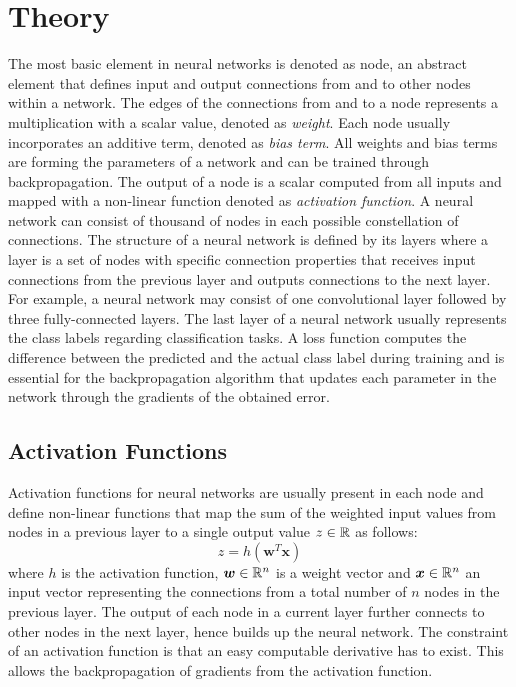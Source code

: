 
\section{Theory}\label{sec:nn_theory}
The most basic element in neural networks is denoted as node, an abstract element that defines input and output connections from and to other nodes within a network.
The edges of the connections from and to a node represents a multiplication with a scalar value, denoted as \emph{weight}.
Each node usually incorporates an additive term, denoted as \emph{bias term}.
All weights and bias terms are forming the parameters of a network and can be trained through backpropagation.
The output of a node is a scalar computed from all inputs and mapped with a non-linear function denoted as \emph{activation function}.
A neural network can consist of thousand of nodes in each possible constellation of connections.
The structure of a neural network is defined by its layers where a layer is a set of nodes with specific connection properties that receives input connections from the previous layer and outputs connections to the next layer.
For example, a neural network may consist of one convolutional layer followed by three fully-connected layers.
The last layer of a neural network usually represents the class labels regarding classification tasks.
A loss function computes the difference between the predicted and the actual class label during training and is essential for the backpropagation algorithm that updates each parameter in the network through the gradients of the obtained error.



\subsection{Activation Functions}\label{sec:nn_theory_acti}
Activation functions for neural networks are usually present in each node and define non-linear functions that map the sum of the weighted input values from nodes in a previous layer to a single output value $z \in \mathbb{R}$ as follows:
\begin{equation}\label{eq:nn_theory_acti}
  z = h(\bm{w}^T \bm{x})
\end{equation}
where $h$ is the activation function, $\bm{w} \in \mathbb{R}^n$ is a weight vector and $\bm{x} \in \mathbb{R}^n$ an input vector representing the connections from a total number of $n$ nodes in the previous layer.
The output of each node in a current layer further connects to other nodes in the next layer, hence builds up the neural network.
The constraint of an activation function is that an easy computable derivative has to exist.
This allows the backpropagation of gradients from the activation function.

